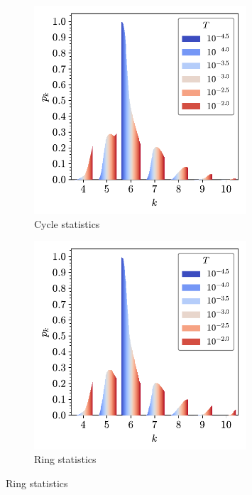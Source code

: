\begin{figure}[tb]
	\centering
     
     \begin{subfigure}[b]{0.48\textwidth}
         \centering
         \includegraphics[width=0.87\textwidth]{./figures/ph/tr_pk_ph.pdf}
         \caption{Cycle statistics}
         \label{fig:trpkpha}
     \end{subfigure}
     \hfill
     \begin{subfigure}[b]{0.48\textwidth}
         \centering
         \includegraphics[width=0.87\textwidth]{./figures/ph/tr_pk_true.pdf}
         \caption{Ring statistics}
         \label{fig:trpkphb}
     \end{subfigure}
     \vspace{0.5cm}
     

\end{figure}
